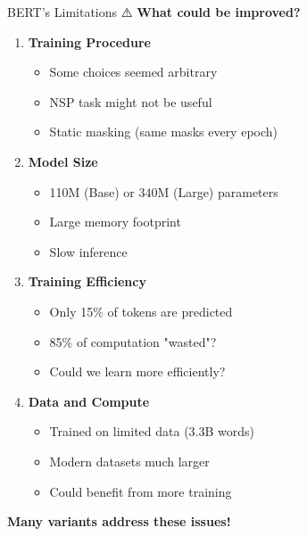 \documentclass[aspectratio=169]{beamer}
\begin{document}
\begin{frame}[shrink=10]{BERT's Limitations ⚠️}
\textbf{What could be improved?}

\vspace{1em}

\begin{enumerate}\setlength{\itemsep}{0pt}
    \item \textbf{Training Procedure}
    \begin{itemize}\setlength{\itemsep}{0pt}
        \item Some choices seemed arbitrary
        \item NSP task might not be useful
        \item Static masking (same masks every epoch)
    \end{itemize}

    \vspace{0.5em}

    \item \textbf{Model Size}
    \begin{itemize}\setlength{\itemsep}{0pt}
        \item 110M (Base) or 340M (Large) parameters
        \item Large memory footprint
        \item Slow inference
    \end{itemize}

    \vspace{0.5em}

    \item \textbf{Training Efficiency}
    \begin{itemize}\setlength{\itemsep}{0pt}
        \item Only 15\% of tokens are predicted
        \item 85\% of computation "wasted"?
        \item Could we learn more efficiently?
    \end{itemize}

    \vspace{0.5em}

    \item \textbf{Data and Compute}
    \begin{itemize}\setlength{\itemsep}{0pt}
        \item Trained on limited data (3.3B words)
        \item Modern datasets much larger
        \item Could benefit from more training
    \end{itemize}
\end{enumerate}

\vspace{0.5em}
\textbf{Many variants address these issues!}
\end{frame}
\end{document}
